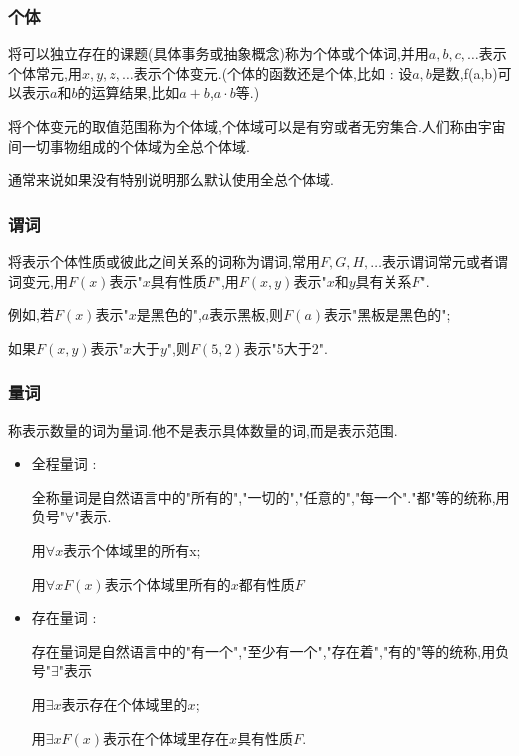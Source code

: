 \documentclass[UTF8,12pt]{ctexbook}
\begin{document}
{{{{  \subsubsection{个体}{
    将可以独立存在的课题(具体事务或抽象概念)称为个体或个体词,并用$a,b,c,\dots$表示个体常元,用$x,y,z,\dots$表示个体变元.(个体的函数还是个体,比如 : 设$a,b$是数,f(a,b)可以表示$a$和$b$的运算结果,比如$a + b$,$a \cdot b$等.)

    将个体变元的取值范围称为个体域,个体域可以是有穷或者无穷集合.人们称由宇宙间一切事物组成的个体域为全总个体域.

    通常来说如果没有特别说明那么默认使用全总个体域.
  }%

  \subsubsection{谓词}{
    将表示个体性质或彼此之间关系的词称为谓词,常用$F,G,H,\dots$表示谓词常元或者谓词变元,用$F(x)$表示"$x$具有性质$F$",用$F(x,y)$表示"$x$和$y$具有关系$F$".

    例如,若$F(x)$表示"$x$是黑色的",$a$表示黑板,则$F(a)$表示"黑板是黑色的";

    如果$F(x,y)$表示"$x$大于$y$",则$F(5,2)$表示"5大于2".
  }%

  \subsubsection{量词}{
    称表示数量的词为量词.他不是表示具体数量的词,而是表示范围.

    \begin{itemize}
      \item {
            全程量词 :

            全称量词是自然语言中的"所有的","一切的","任意的","每一个"."都"等的统称,用负号"$\forall$"表示.

            用$\forall x$表示个体域里的所有x;

            用$\forall x F(x)$表示个体域里所有的$x$都有性质$F$
            }
      \item {
            存在量词 :

            存在量词是自然语言中的"有一个","至少有一个","存在着","有的"等的统称,用负号"$\exists$"表示

            用$\exists x$表示存在个体域里的$x$;

            用$\exists x F(x)$表示在个体域里存在$x$具有性质$F$.
            }
    \end{itemize}
  }%

}}}}
\end{document}
